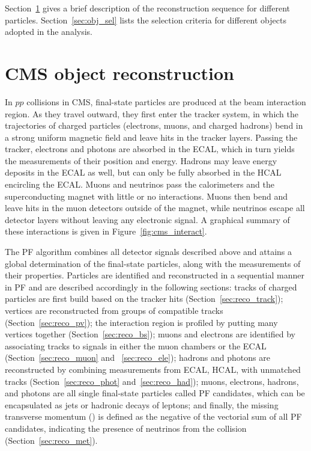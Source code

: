 Section~\ref{sec:obj_reco} gives a brief description of the reconstruction sequence for different particles.
Section~\ref{sec:obj_sel} lists the selection criteria for different objects adopted in the \hmm analysis.


\section{CMS object reconstruction}\label{sec:obj_reco}

In $pp$ collisions in CMS, final-state particles are produced at the beam interaction region. 
As they travel outward, they first enter the tracker system, in which the trajectories of charged particles 
(electrons, muons, and charged hadrons) bend in a strong uniform magnetic field and leave hits in the tracker layers. 
Passing the tracker, electrons and photons are absorbed in the ECAL, which in turn yields the measurements of their position and energy.
Hadrons may leave energy deposits in the ECAL as well, but can only be fully absorbed in the HCAL encircling the ECAL. 
Muons and neutrinos pass the calorimeters and the superconducting magnet with little or no interactions.
Muons then bend and leave hits in the muon detectors outside of the magnet, 
while neutrinos escape all detector layers without leaving any electronic signal.
A graphical summary of these interactions is given in Figure~\ref{fig:cms_interact}.

The PF algorithm combines all detector signals described above and attains a global determination of the final-state particles, 
along with the measurements of their properties.
Particles are identified and reconstructed in a sequential manner in PF and are described accordingly in the following sections:
tracks of charged particles are first build based on the tracker hits (Section~\ref{sec:reco_track}); 
vertices are reconstructed from groups of compatible tracks (Section~\ref{sec:reco_pv});
the interaction region is profiled by putting many vertices together (Section~\ref{sec:reco_bs});
muons and electrons are identified by associating tracks to signals in either the muon chambers or the ECAL (Section~\ref{sec:reco_muon} and ~\ref{sec:reco_ele});
hadrons and photons are reconstructed by combining measurements from ECAL, HCAL, with unmatched tracks (Section~\ref{sec:reco_phot} and~\ref{sec:reco_had});
muons, electrons, hadrons, and photons are all single final-state particles called PF candidates, 
which can be encapsulated as jets or hadronic decays of \tau leptons;
and finally, the missing transverse momentum (\MET) is defined as the negative of the vectorial sum of all PF candidates,
indicating the presence of neutrinos from the collision (Section~\ref{sec:reco_met}).

